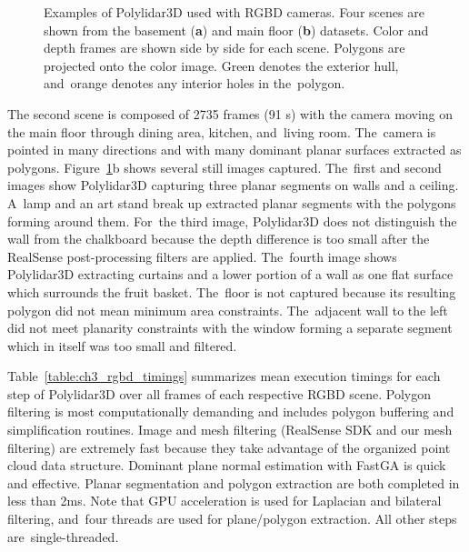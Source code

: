 \begin{figure}[ht]
  \caption[Example of Polylidar3D used with \ac{RGBD} cameras]{Examples of Polylidar3D used with \ac{RGBD} cameras. Four scenes are shown from the basement (\textbf{a}) and main floor (\textbf{b}) datasets. Color and depth frames are shown side by side for each scene. Polygons are projected onto the color image. Green denotes the exterior hull, and~orange denotes any interior holes in the~polygon.}\label{fig:ch3_rgbd}
\end{figure}

The second scene is composed of 2735 frames (91 s) with the camera moving on the main floor through dining area, kitchen, and~living room. The~camera is pointed in many directions and with many dominant planar surfaces extracted as polygons. Figure~\ref{fig:ch3_rgbd}b shows several still images captured. The~first and second images show Polylidar3D capturing three planar segments on walls and a ceiling. A~lamp and an art stand break up extracted planar segments with the polygons forming around them. For~the third image, Polylidar3D does not distinguish the wall from the chalkboard because the depth difference is too small after the RealSense post-processing filters are applied.  The~fourth image shows Polylidar3D extracting curtains and a lower portion of a wall as one flat surface which surrounds the fruit basket. The~floor is not captured because its resulting polygon did not mean minimum area constraints. The~adjacent wall to the left did not meet planarity constraints with the window forming a separate segment which in itself was too small and filtered. 

Table~\ref{table:ch3_rgbd_timings} summarizes mean execution timings for each step of Polylidar3D over all frames of each respective \ac{RGBD} scene. Polygon filtering is most computationally demanding and includes polygon buffering and simplification routines.  Image and mesh filtering (RealSense SDK and our mesh filtering) are extremely fast because they take advantage of the organized point cloud data structure. Dominant plane normal estimation with FastGA is quick and effective. Planar segmentation and polygon extraction are both completed in less than 2ms. Note that GPU acceleration is used for Laplacian and bilateral filtering, and~four threads are used for plane/polygon extraction. All other steps are~single-threaded.

